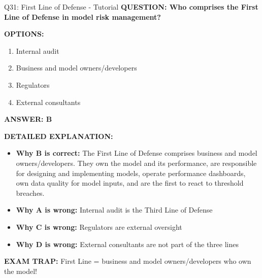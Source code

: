 \documentclass[8pt]{beamer}
\begin{document}
	\begin{frame}{Q31: First Line of Defense - Tutorial}
		\fontsize{6.5}{7.5}\selectfont
		\textbf{QUESTION: Who comprises the First Line of Defense in model risk management?}
		
		\vspace{0.1cm}
		\textbf{OPTIONS:}
		\begin{enumerate}
			\item Internal audit
			\item Business and model owners/developers
			\item Regulators
			\item External consultants
		\end{enumerate}
		
		\vspace{0.1cm}
		\textcolor{myblue}{\textbf{ANSWER: B}}
		
		\vspace{0.1cm}
		\textbf{DETAILED EXPLANATION:}
		\begin{itemize}
			\item \textbf{Why B is correct:} The First Line of Defense comprises business and model owners/developers. They own the model and its performance, are responsible for designing and implementing models, operate performance dashboards, own data quality for model inputs, and are the first to react to threshold breaches.
			\item \textbf{Why A is wrong:} Internal audit is the Third Line of Defense
			\item \textbf{Why C is wrong:} Regulators are external oversight
			\item \textbf{Why D is wrong:} External consultants are not part of the three lines
		\end{itemize}
		
		\textcolor{myred}{\textbf{EXAM TRAP:}} First Line = \textcolor{myblue}{business and model owners/developers} who own the model!
	\end{frame}
	
\end{document}
